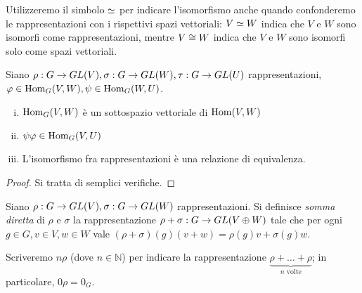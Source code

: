 Utilizzeremo il simbolo $\simeq$ per indicare l'isomorfismo anche quando confonderemo le rappresentazioni con i rispettivi spazi vettoriali: $V\simeq W$ indica che $V$ e $W$ sono isomorfi come rappresentazioni, mentre $V\cong W$ indica che $V$ e $W$ sono isomorfi solo come spazi vettoriali.

\begin{proposition}
Siano $\rho:G\to GL(V),\allowbreak\sigma:G\to GL(W),\allowbreak\tau:G\to GL(U)$ rappresentazioni, $\varphi\in\operatorname{Hom}_G(V,W),\allowbreak\psi\in\operatorname{Hom}_G(W,U)$.
\begin{enumerate}[(i)]
\item $\operatorname{Hom}_G(V,W)$ è un sottospazio vettoriale di $\operatorname{Hom}(V,W)$
\item $\psi\varphi\in\operatorname{Hom}_G(V,U)$
\item L'isomorfismo fra rappresentazioni è una relazione di equivalenza.
\end{enumerate}
\end{proposition}
\begin{proof}
Si tratta di semplici verifiche.
\end{proof}

\begin{definition}
Siano $\rho:G\to GL(V),\allowbreak\sigma:G\to GL(W)$ rappresentazioni. Si definisce \emph{somma diretta} di $\rho$ e $\sigma$ la rappresentazione $\rho+\sigma:G\to GL(V\oplus W)$ tale che per ogni $g\in G\comma v\in V\comma w\in W$ vale $(\rho+\sigma)(g)(v+w)=\rho(g)v+\sigma(g)w$.
\end{definition}

Scriveremo $n\rho$ (dove $n\in\mathbb{N}$) per indicare la rappresentazione $\underbrace{\rho+\ldots+\rho}_{\text{$n$ volte}}$; in particolare, $0\rho=0_G$.

